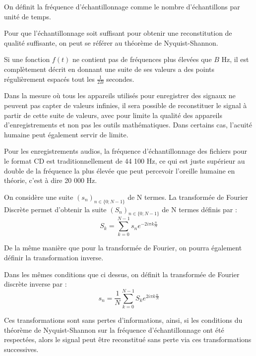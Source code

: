	\begin{mydef}
		On définit la fréquence d'échantillonnage comme le nombre d'échantillons par unité de temps.  
	\end{mydef}
		Pour que l'échantillonnage soit suffisant pour obtenir une reconstitution de qualité suffisante, on peut se référer au théorème de Nyquist-Shannon. 
		
	\begin{mythm}
		Si une fonction $f(t)$ ne contient pas de fréquences plus élevées que $B$ Hz, il est complètement décrit en donnant une suite de ses valeurs a des points régulièrement espacés tout les $\frac{1}{2B}$ secondes.
	\end{mythm}
	
	Dans la mesure où tous les appareils utilisés pour enregistrer des signaux ne peuvent pas capter de valeurs infinies, il sera possible de reconstituer le signal à partir de cette suite de valeurs, avec pour limite la qualité des appareils d'enregistrements et non pas les outils mathématiques. Dans certains cas, l'acuité humaine peut également servir de limite.
	
	\begin{myexmpl}
		 Pour les enregistrements audios, la fréquence d'échantillonnage des fichiers pour le format CD est traditionnellement de 44 100 Hz, ce qui est juste supérieur au double de la fréquence la plus élevée que peut percevoir l'oreille humaine en théorie, c'est à dire 20 000 Hz. 
	\end{myexmpl}
	
	\begin{mydef}
			On considère une suite $(s_n)_{n\in \{0; N -1 \}}$ de N termes. La transformée de Fourier Discrète permet d'obtenir la suite  $(S_n)_{n\in \{0; N -1 \}}$ de N termes définis par :
			$$ S_k = \sum_{k=0}^{N-1}s_n e^{-2i\pi k\frac{n}{N}} $$
	\end{mydef}
		De la même manière que pour la transformée de Fourier, on pourra également définir la transformation inverse.
		
	\begin{mydef}
		Dans les mêmes conditions que ci dessus, on définit la transformée de Fourier discrète inverse par :
			$$ s_n =\frac{1}{N} \sum_{k=0}^{N-1}S_k e^{2i\pi k\frac{n}{N}} $$
	\end{mydef}
	
	Ces transformations sont sans pertes d'informations, ainsi, si les conditions du théorème de Nyquist-Shannon sur la fréquence d'échantillonnage ont été respectées, alors le signal peut être reconstitué sans perte via ces transformations successives. 
	

